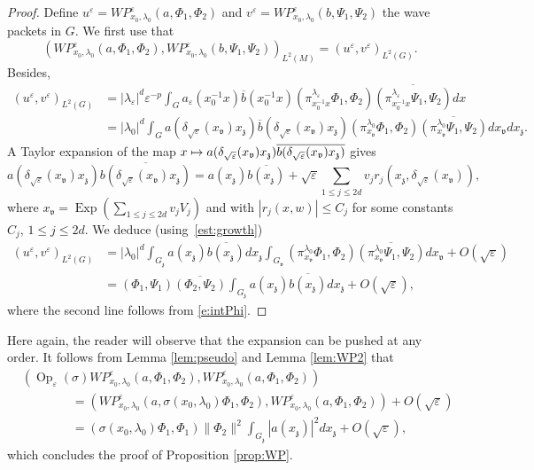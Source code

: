 \documentclass[10pt]{amsart}
\newcommand\mto{\mathchoice{\longmapsto}{\mapsto}{\mapsto}{\mapsto}}
\DeclareMathOperator{\Exp}{Exp}
\DeclareMathOperator{\Op}{Op}
\theoremstyle{plain}
\theoremstyle{definition}
\let\eps\varepsilon
\begin{document}
\begin{proof}
Define $u^\eps= WP^\eps_{x_0,\lambda_0} (a,\Phi_1,\Phi_2)$ and $v^\eps= WP^\eps_{x_0,\lambda_0} (b,\Psi_1,\Psi_2)$ the wave packets in $G$. We first use that
\[
\left(WP^\eps_{x_0,\lambda_0} (a,\Phi_1,\Phi_2),WP^\eps_{x_0,\lambda_0} (b,\Psi_1,\Psi_2)\right)_{L^2(M)}=(u^\eps,v^\eps)_{L^2(G)}.
\]
Besides,
\begin{align*}
(u^\eps,v^\eps)_{L^2(G)} & = |\lambda_\eps|^d \eps^{-p} \int _G a_\eps (x_0^{-1} x) \overline b(x_0^{-1} x) (\pi^{\lambda_\eps}_{x_0^{-1} x}\Phi_1,\Phi_2) \overline{ (\pi^{\lambda_\eps}_{x_0^{-1} x}\Psi_1,\Psi_2) } dx\\
&= |\lambda_0|^d \int_G a\left(\delta_{\sqrt\eps} (x_{\mathfrak v}) x_{\mathfrak z}\right)
\overline b \left(\delta_{\sqrt\eps} (x_{\mathfrak v}) x_{\mathfrak z}\right)
(\pi^{\lambda_0}_{x_{\mathfrak v}} \Phi_1,\Phi_2)
\overline{(\pi^{\lambda_0}_{x_{\mathfrak v}} \Psi_1,\Psi_2) } dx_{\mathfrak v} dx_{\mathfrak z}.
\end{align*}
A Taylor expansion of the map $x\mto a(\delta_{\sqrt\eps}(x_{\mathfrak v})x_{\mathfrak z}) \overline{b(\delta_{\sqrt\eps}(x_{\mathfrak v})x_{\mathfrak z}) } $ gives
\[
a(\delta_{\sqrt\eps}(x_{\mathfrak v})x_{\mathfrak z}) \overline{b(\delta_{\sqrt\eps}(x_{\mathfrak v})x_{\mathfrak z}) } =
a(x_{\mathfrak z}) \overline{b(x_{\mathfrak z}) } +\sqrt\eps \sum_{1\leq j\leq 2d} v_j r_j(x_{\mathfrak z},\delta_{\sqrt\eps}(x_{\mathfrak v})),
\]
where $x_{\mathfrak v}=\Exp (\sum_{1\leq j\leq 2d} v_jV_j)$ and with $| r_j(x,w) | \leq C_j$ for some constants $C_j$, $1\leq j\leq 2d$.
We deduce (using~\eqref{est:growth})
\begin{align*}
(u^\eps,v^\eps)_{L^2(G)}&= |\lambda_0|^d \int_{G_{\mathfrak z}} a(x_{\mathfrak z}) \overline{b(x_{\mathfrak z}) } dx_{\mathfrak z}
\int_{G_{\mathfrak v}} (\pi^{\lambda_0}_{x_{\mathfrak v}} \Phi_1,\Phi_2) \overline{ (\pi^{\lambda_0}_{ x_{\mathfrak v}} \Psi_1,\Psi_2)} dx_{\mathfrak v} +O(\sqrt\eps) \\
&= (\Phi_1,\Psi_1)\overline{(\Phi_2,\Psi_2)}\int_{G_{\mathfrak z}} a(x_{\mathfrak z}) \overline{b(x_{\mathfrak z}) } dx_{\mathfrak z} +O(\sqrt \eps),
\end{align*}
where the second line follows from \eqref{e:intPhi}.
\end{proof}
Here again, the reader will observe that the expansion can be pushed at any order. It follows from Lemma \ref{lem:pseudo} and Lemma \ref{lem:WP2} that
\begin{align*}
&(\Op_\eps(\sigma) WP^\eps_{x_0,\lambda_0}(a,\Phi_1,\Phi_2), WP^\eps_{x_0,\lambda_0}(a,\Phi_1,\Phi_2)) \\
&\qquad \qquad = (WP^\eps_{x_0,\lambda_0}(a,\sigma(x_0,\lambda_0)\Phi_1,\Phi_2), WP^\eps_{x_0,\lambda_0}(a,\Phi_1,\Phi_2))+O(\sqrt\eps) \\
&\qquad \qquad =(\sigma(x_0,\lambda_0)\Phi_1,\Phi_1) \|\Phi_2\|^2\int_{G_{\mathfrak z}}|a(x_{\mathfrak z})|^2dx_{\mathfrak z} +O(\sqrt\eps),
\end{align*}
which concludes the proof of Proposition \ref{prop:WP}.
\end{document}
